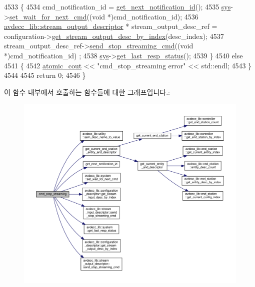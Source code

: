 \begin{DoxyCode}
4533     \{
4534         cmd\_notification\_id = \hyperlink{classcmd__line_a57486218387d1aa9d262eb7c176154ad}{get\_next\_notification\_id}();
4535         \hyperlink{classcmd__line_a485db4800e331cb4052c447fdf5d154e}{sys}->\hyperlink{classavdecc__lib_1_1system_a26b769584f10225077da47583edda33e}{set\_wait\_for\_next\_cmd}((\textcolor{keywordtype}{void} *)cmd\_notification\_id);
4536         \hyperlink{classavdecc__lib_1_1stream__output__descriptor}{avdecc\_lib::stream\_output\_descriptor} * stream\_output\_desc\_ref =
       configuration->\hyperlink{classavdecc__lib_1_1configuration__descriptor_a300ea5957342e2e9579318135da02856}{get\_stream\_output\_desc\_by\_index}(desc\_index);
4537         stream\_output\_desc\_ref->\hyperlink{classavdecc__lib_1_1stream__output__descriptor_a3a5df38802b65e88b6adb330361e4fdf}{send\_stop\_streaming\_cmd}((\textcolor{keywordtype}{void} *)cmd\_notification\_id)
      ;
4538         \hyperlink{classcmd__line_a485db4800e331cb4052c447fdf5d154e}{sys}->\hyperlink{classavdecc__lib_1_1system_aa63e8d1a4e51f695cdcccc9340922407}{get\_last\_resp\_status}();
4539     \}
4540     \textcolor{keywordflow}{else}
4541     \{
4542         \hyperlink{cmd__line_8h_a0bc38ccc65c79ba06c6fcd7b4bf554c3}{atomic\_cout} << \textcolor{stringliteral}{"cmd\_stop\_streaming error"} << std::endl;
4543     \}
4544 
4545     \textcolor{keywordflow}{return} 0;
4546 \}
\end{DoxyCode}


이 함수 내부에서 호출하는 함수들에 대한 그래프입니다.\+:
\nopagebreak
\begin{figure}[H]
\begin{center}
\leavevmode
\includegraphics[width=350pt]{classcmd__line_a7ab3b0bf5e3be7c1d5abec9aea3322ac_cgraph}
\end{center}
\end{figure}




